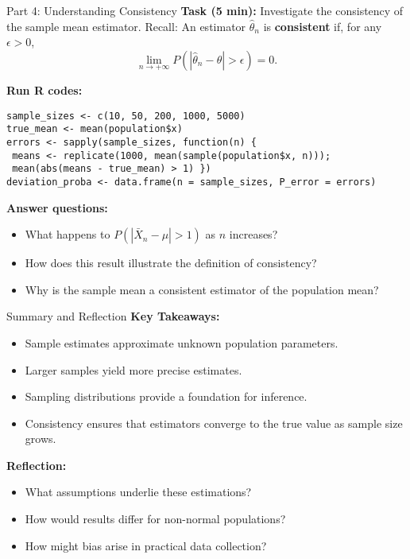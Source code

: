 \documentclass[main.tex]{subfiles}
\begin{document}
\begin{frame}[fragile]
\begin{block}{Part 4: Understanding Consistency}
\textbf{Task (5 min):} Investigate the consistency of the sample mean estimator.  
Recall: An estimator $\hat{\theta}_n$ is \textbf{consistent} if, for any $\epsilon > 0$,
\[
    \lim_{n \to +\infty} P\left(|\hat{\theta}_n - \theta| > \epsilon\right) = 0.
\]

\textbf{Run R codes:}
{\footnotesize
\begin{verbatim}
sample_sizes <- c(10, 50, 200, 1000, 5000)
true_mean <- mean(population$x)
errors <- sapply(sample_sizes, function(n) { 
 means <- replicate(1000, mean(sample(population$x, n))); 
 mean(abs(means - true_mean) > 1) })
deviation_proba <- data.frame(n = sample_sizes, P_error = errors)
\end{verbatim}}

\textbf{Answer questions:}
\begin{itemize}\small
  \item What happens to $P(|\bar{X}_n - \mu| > 1)$ as $n$ increases?
  \item How does this result illustrate the definition of consistency?
  \item Why is the sample mean a consistent estimator of the population mean?
\end{itemize}
\end{block}
\end{frame}


\begin{frame}
\begin{block}{Summary and Reflection}
\textbf{Key Takeaways:}
\begin{itemize}
  \item Sample estimates approximate unknown population parameters.
  \item Larger samples yield more precise estimates.
  \item Sampling distributions provide a foundation for inference.
  \item Consistency ensures that estimators converge to the true value as sample size grows.
\end{itemize}

\textbf{Reflection:}
\begin{itemize}
  \item What assumptions underlie these estimations?
  \item How would results differ for non-normal populations?
  \item How might bias arise in practical data collection?
\end{itemize}
\end{block}
\end{frame}
\end{document}
